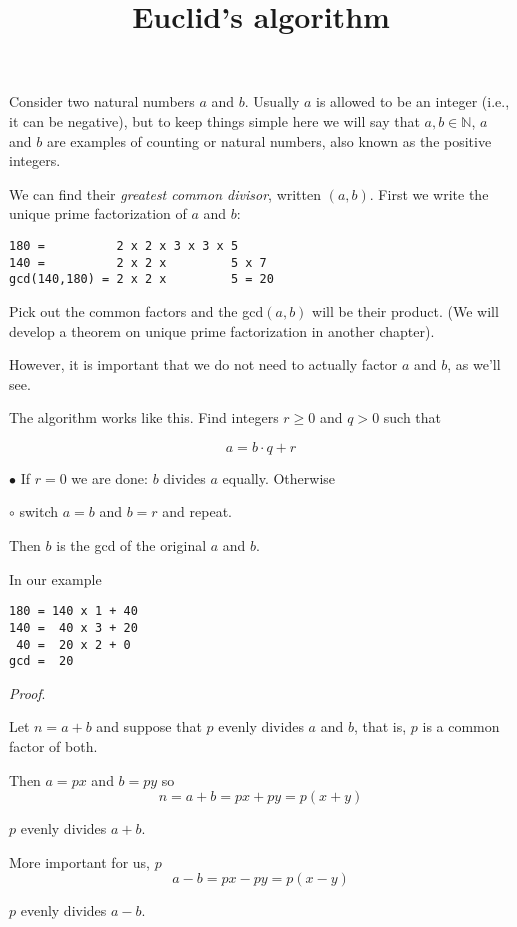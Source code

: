 \documentclass[11pt, oneside]{article}
\title{Euclid's algorithm}
\date{}
\begin{document}
\maketitle
\Large


Consider two natural numbers $a$ and $b$.  Usually $a$ is allowed to be an integer (i.e., it can be negative), but to keep things simple here we will say that $a,b \in \mathbb{N}$, $a$ and $b$ are examples of counting or natural numbers, also known as the positive integers.

We can find their \emph{greatest common divisor}, written $(a,b)$.  First we write the unique prime factorization of $a$ and $b$:

\begin{verbatim}
180 =          2 x 2 x 3 x 3 x 5
140 =          2 x 2 x         5 x 7
gcd(140,180) = 2 x 2 x         5 = 20
\end{verbatim}

Pick out the common factors and the gcd$(a,b)$ will be their product.  (We will develop a theorem on unique prime factorization in another chapter).

However, it is important that we do not need to actually factor $a$ and $b$, as we'll see.

The algorithm works like this.  Find integers $r \ge 0$ and $q > 0$ such that

\[ a = b \cdot q + r \]

$\bullet$ If $r = 0$ we are done:  $b$ divides $a$ equally.  Otherwise

$ \circ$ switch $a = b$ and $b = r$ and repeat.

Then $b$ is the gcd of the original $a$ and $b$.  

In our example

\begin{verbatim}
180 = 140 x 1 + 40
140 =  40 x 3 + 20
 40 =  20 x 2 + 0
gcd =  20
\end{verbatim}

\emph{Proof}.

Let $n = a + b$ and suppose that $p$ evenly divides $a$ and $b$, that is, $p$ is a common factor of both.

Then $a = px$ and $b = py$ so
\[ n = a + b = px + py = p(x + y) \]

$p$ evenly divides $a + b$.  

More important for us, $p$
\[ a - b = px - py = p(x - y) \]

$p$ evenly divides $a - b$. 
\end{document}
